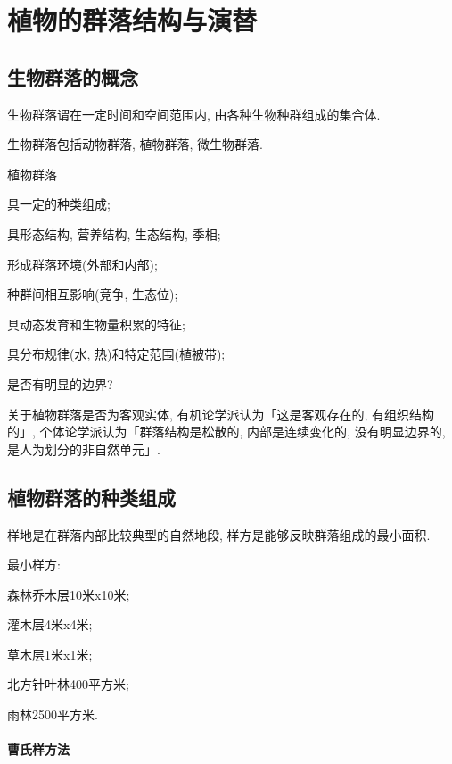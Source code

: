 \documentclass{ctexart}
\begin{document}
\section{植物的群落结构与演替} %
\label{sec:植物的群落结构与演替}

\subsection{生物群落的概念} %
\label{sub:生物群落的概念}

生物群落谓在一定时间和空间范围内, 由各种生物种群组成的集合体.
\par
生物群落包括动物群落, 植物群落, 微生物群落.
\par
植物群落
\begin{cenum}
    \item 具一定的种类组成;
    \item 具形态结构, 营养结构, 生态结构, 季相;
    \item 形成群落环境(外部和内部);
    \item 种群间相互影响(竞争, 生态位);
    \item 具动态发育和生物量积累的特征;
    \item 具分布规律(水, 热)和特定范围(植被带);
    \item 是否有明显的边界?
\end{cenum}
关于植物群落是否为客观实体, 有机论学派认为「这是客观存在的, 有组织结构的」, 个体论学派认为「群落结构是松散的, 内部是连续变化的, 没有明显边界的, 是人为划分的非自然单元」.


\subsection{植物群落的种类组成} %
\label{sub:植物群落的种类组成}

样地是在群落内部比较典型的自然地段, 样方是能够反映群落组成的最小面积.
\par
最小样方:
\begin{cenum}
    \item 森林乔木层10米x10米;
    \item 灌木层4米x4米;
    \item 草木层1米x1米;
    \item 北方针叶林400平方米;
    \item 雨林2500平方米.
\end{cenum}
\paragraph{曹氏样方法} %
\label{par:曹氏样方法}
\end{document}
